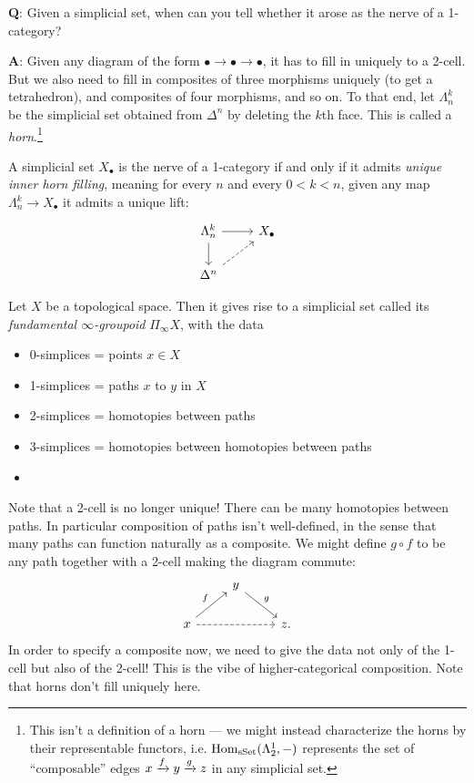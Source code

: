 \documentclass[11pt,openany]{book}
\begin{document}
\textbf{Q}: Given a simplicial set, when can you tell whether it arose as the nerve of a 1-category?

\textbf{A}: Given any diagram of the form $\bullet \to \bullet \to \bullet$, it has to fill in uniquely to a 2-cell. But we also need to fill in composites of three morphisms uniquely (to get a tetrahedron), and composites of four morphisms, and so on. To that end, let $\Lambda^k_n$ be the simplicial set obtained from $\Delta^n$ by deleting the $k$th face. This is called a \textit{horn}.\footnote{
This isn't a definition of a horn --- we might instead characterize the horns by their representable functors, i.e. $\mathrm{Hom}_{\mathrm{sSet}}(\Lambda_2^1,-)$ represents the set of ``composable'' edges $x \xrightarrow{f} y \xrightarrow{g} z$ in any simplicial set.}

\begin{proposition} A simplicial set $X_\bullet$ is the nerve of a 1-category if and only if it admits \textit{unique inner horn filling}, meaning for every $n$ and every $0 < k < n$, given any map $\Lambda^k_n \to X_\bullet$ it admits a unique lift:
\[ \begin{tikzcd}
    \Lambda^k_n\rar\dar & X_\bullet\\
    \Delta^n\ar[ur,dashed] & 
\end{tikzcd} \]
\end{proposition}



\begin{example} Let $X$ be a topological space. Then it gives rise to a simplicial set called its \textit{fundamental $\infty$-groupoid} $\Pi_{\infty} X$, with the data
\begin{itemize}
    \item 0-simplices = points $x \in X$
    \item 1-simplices = paths $x$ to $y$ in $X$
    \item 2-simplices = homotopies between paths
    \item 3-simplices = homotopies between homotopies between paths
    \item[$\vdots$]
\end{itemize}
Note that a 2-cell is no longer unique! There can be many homotopies between paths. In particular composition of paths isn't well-defined, in the sense that many paths can function naturally as a composite. We might define $g\circ f$ to be any path together with a 2-cell making the diagram commute:
\[ \begin{tikzcd}
     & y\ar[dr,"g" above right]\\
    x\ar[ur,"f" above left]\ar[rr,dashed] &  & z.
\end{tikzcd} \]
In order to specify a composite now, we need to give the data not only of the 1-cell but also of the 2-cell! This is the vibe of higher-categorical composition. Note that horns don't fill uniquely here.
\end{example}
\end{document}
